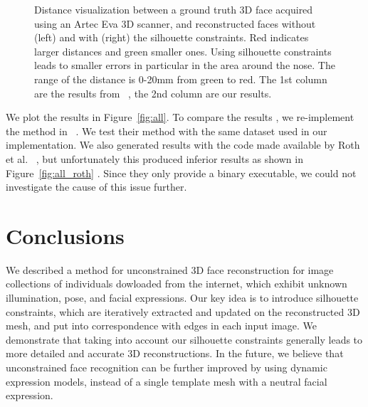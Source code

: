 \begin{figure}[htb]
  \caption{\label{fig:groundtruth}
           Distance visualization between a ground truth 3D face acquired using an Artec Eva 3D scanner, and reconstructed faces without (left) and with (right) the silhouette constraints. Red indicates larger distances and green smaller ones. Using silhouette constraints leads to smaller errors in particular in the area around the nose. The range of the distance is 0-20mm from green to red. The 1st column are the results from ~\cite{Roth:2015:UFR}, the 2nd column are our results. }
\end{figure}


We plot the results in Figure~\ref{fig:all}. To compare the results , we re-implement the method in ~\cite{Roth:2015:UFR}. We test their method with the same dataset used in our implementation. We also generated results with the code made available by Roth et al. ~\cite{Roth:2015:UFR}, but unfortunately this produced inferior results as shown in Figure~\ref{fig:all_roth} . Since they only provide a binary executable, we could not investigate the cause of this issue further.
\section{Conclusions}
\label{sec:conclusions}

We described a method for unconstrained 3D face reconstruction for image collections of individuals dowloaded from the internet, which exhibit unknown illumination, pose, and facial expressions. Our key idea is to introduce silhouette constraints, which are iteratively extracted and updated on the reconstructed 3D mesh, and put into correspondence with edges in each input image. We demonstrate that taking into account our silhouette constraints generally leads to more detailed and accurate 3D reconstructions. In the future, we believe that unconstrained face recognition can be further improved by using dynamic expression models, instead of a single template mesh with a neutral facial expression.


